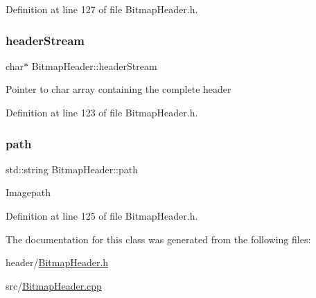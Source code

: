 Definition at line 127 of file Bitmap\+Header.\+h.

\mbox{\label{classBitmapHeader_a9109a897251733f77942008318482426}} 
\subsubsection{\texorpdfstring{headerStream}{headerStream}}
{\footnotesize\ttfamily char$\ast$ Bitmap\+Header\+::header\+Stream\hspace{0.3cm}{\ttfamily [private]}}

Pointer to char array containing the complete header 

Definition at line 123 of file Bitmap\+Header.\+h.

\mbox{\label{classBitmapHeader_a928111fbaf59eebf24b750cbca11c5dd}} 
\subsubsection{\texorpdfstring{path}{path}}
{\footnotesize\ttfamily std\+::string Bitmap\+Header\+::path\hspace{0.3cm}{\ttfamily [private]}}

Imagepath 

Definition at line 125 of file Bitmap\+Header.\+h.



The documentation for this class was generated from the following files\+:\begin{DoxyCompactItemize}
\item 
header/\mbox{\hyperlink{BitmapHeader_8h}{Bitmap\+Header.\+h}}\item 
src/\mbox{\hyperlink{BitmapHeader_8cpp}{Bitmap\+Header.\+cpp}}\end{DoxyCompactItemize}
